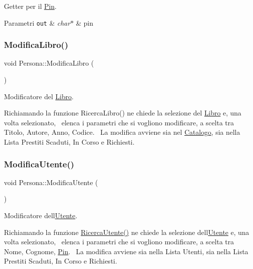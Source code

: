 Getter per il \mbox{\hyperlink{class_pin}{Pin}}. 


\begin{DoxyParams}[1]{Parametri}
\mbox{\tt out}  & {\em char$\ast$} & pin \\
\hline
\end{DoxyParams}
\mbox{\label{class_persona_a2da81a9fb38cf71e51a67efdb3510b13}} 
\subsubsection{\texorpdfstring{Modifica\+Libro()}{ModificaLibro()}}
{\footnotesize\ttfamily void Persona\+::\+Modifica\+Libro (\begin{DoxyParamCaption}{ }\end{DoxyParamCaption})}



Modificatore del \mbox{\hyperlink{class_libro}{Libro}}. 

Richiamando la funzione Ricerca\+Libro() ne chiede la selezione del \mbox{\hyperlink{class_libro}{Libro}} e, una volta selezionato,~\newline
elenca i parametri che si vogliono modificare, a scelta tra Titolo, Autore, Anno, Codice.~\newline
La modifica avviene sia nel \mbox{\hyperlink{class_catalogo}{Catalogo}}, sia nella Lista Prestiti Scaduti, In Corso e Richiesti. \mbox{\label{class_persona_aba5185684ebc81901b47abd587d01465}} 
\subsubsection{\texorpdfstring{Modifica\+Utente()}{ModificaUtente()}}
{\footnotesize\ttfamily void Persona\+::\+Modifica\+Utente (\begin{DoxyParamCaption}{ }\end{DoxyParamCaption})}



Modificatore dell\textquotesingle{}\mbox{\hyperlink{class_utente}{Utente}}. 

Richiamando la funzione \mbox{\hyperlink{class_persona_a11bc0159627eb83be83b00c56ff1a3f9}{Ricerca\+Utente()}} ne chiede la selezione dell\textquotesingle{}\mbox{\hyperlink{class_utente}{Utente}} e, una volta selezionato,~\newline
elenca i parametri che si vogliono modificare, a scelta tra Nome, Cognome, \mbox{\hyperlink{class_pin}{Pin}}.~\newline
La modifica avviene sia nella Lista Utenti, sia nella Lista Prestiti Scaduti, In Corso e Richiesti. \mbox{\label{class_persona_ad46f21f01f3c49c7de0bb5bb0fca0251}} 

